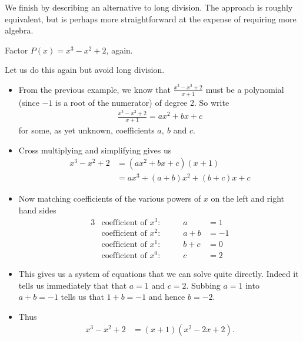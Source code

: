 We finish by describing an alternative to long division. The approach is roughly
equivalent, but is perhaps more straightforward at the expense of requiring
more algebra.
\begin{eg}
Factor $P(x)=x^3-x^2+2$, again.

\soln Let us do this again but avoid long division.
\begin{itemize}
 \item From the previous example, we know that  $\frac{x^3-x^2+2}{x+1}$ must
be a polynomial (since $-1$ is a root of the numerator) of degree 2. So write
\begin{align*}
\frac{x^3-x^2+2}{x+1}=ax^2+bx+c
\end{align*}
for some, as yet unknown, coefficients $a,\ b$ and $c$.
\item Cross multiplying and simplifying gives us
\begin{align*}
x^3-x^2+2&=(ax^2+bx+c)(x+1)\\
&=ax^3+(a+b)x^2+(b+c)x+c
\end{align*}
\item Now matching coefficients of the various powers of $x$ on the left and right
hand sides
\begin{alignat*}{3}
&\text{coefficient of $x^3$:}\qquad&a&=1\\
&\text{coefficient of $x^2$:}&a+b&=-1\\
&\text{coefficient of $x^1$:}& b+c&=0\\
&\text{coefficient of $x^0$:}& c&=2
\end{alignat*}
\item This gives us a system of equations that we can solve quite directly. Indeed it
tells us immediately that that $a=1$ and $c=2$. Subbing $a=1$ into $a+b=-1$ tells us
that $1+b=-1$ and hence $b=-2$.
\item Thus
\begin{align*}
x^3-x^2+2 &= (x+1)(x^2-2x+2).
\end{align*}
\end{itemize}
\end{eg}
